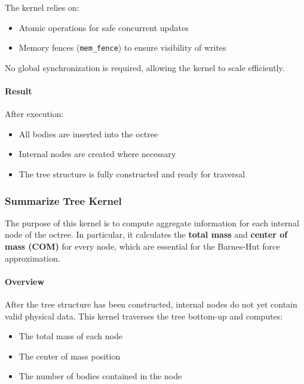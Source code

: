 \documentclass[12pt]{article}
\begin{document}
The kernel relies on:

\begin{itemize}
    \item Atomic operations for safe concurrent updates
    \item Memory fences (\texttt{mem\_fence}) to ensure visibility of writes
\end{itemize}

No global synchronization is required, allowing the kernel to scale efficiently.

\paragraph{Result}

After execution:

\begin{itemize}
    \item All bodies are inserted into the octree
    \item Internal nodes are created where necessary
    \item The tree structure is fully constructed and ready for traversal
\end{itemize}

\subsubsection{Summarize Tree Kernel}

The purpose of this kernel is to compute aggregate information for each internal
node of the octree. In particular, it calculates the \textbf{total mass} and
\textbf{center of mass (COM)} for every node, which are essential for the
Barnes-Hut force approximation.

\paragraph{Overview}

After the tree structure has been constructed, internal nodes do not yet contain
valid physical data. This kernel traverses the tree bottom-up and computes:

\begin{itemize}
    \item The total mass of each node
    \item The center of mass position
    \item The number of bodies contained in the node
\end{itemize}
\end{document}
